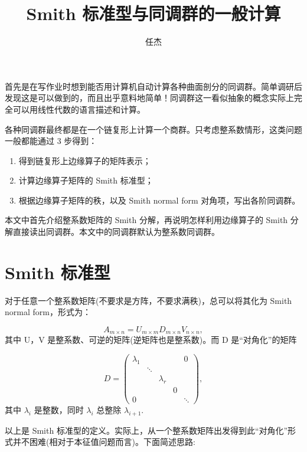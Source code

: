 \documentclass[UTF8]{ctexart}
\begin{document}
\title{Smith 标准型与同调群的一般计算}
\author{任杰}
\date{}

\maketitle
\noindent 首先是在写作业时想到能否用计算机自动计算各种曲面剖分的同调群。简单调研后发现这是可以做到的，而且出乎意料地简单！同调群这一看似抽象的概念实际上完全可以用线性代数的语言描述和计算。

各种同调群最终都是在一个链复形上计算一个商群。只考虑整系数情形，这类问题一般都能通过 3 步得到：
\begin{enumerate}
\item 得到链复形上边缘算子的矩阵表示；
\item 计算边缘算子矩阵的 Smith 标准型；
\item 根据边缘算子矩阵的秩，以及 Smith normal form 对角项，写出各阶同调群。
\end{enumerate}
本文中首先介绍整系数矩阵的 Smith 分解，再说明怎样利用边缘算子的 Smith 分解直接读出同调群。本文中的同调群默认为整系数同调群。

\section*{Smith 标准型}
\noindent
对于任意一个整系数矩阵(不要求是方阵，不要求满秩)，总可以将其化为 Smith normal form，形式为：

\begin{equation}
A_{m\times n}=U_{m\times m}D_{m\times n}V_{n\times n},
\end{equation}
其中 U，V 是整系数、可逆的矩阵(逆矩阵也是整系数)。而 D 是“对角化”的矩阵 

\begin{equation}
D=\left(\begin{array}{ccccc}
\lambda_{1} &  &  &  & 0\\
 & \ddots\\
 &  & \lambda_{r}\\
 &  &  & 0\\
0 &  &  &  & \ddots
\end{array}\right),
\end{equation}
其中 $\lambda_{i}$ 是整数，同时 $\lambda_{i}$ 总整除 $\lambda_{i+1}$.

以上是 Smith 标准型的定义。实际上，从一个整系数矩阵出发得到此“对角化”形式并不困难(相对于本征值问题而言)。下面简述思路:
\end{document}
